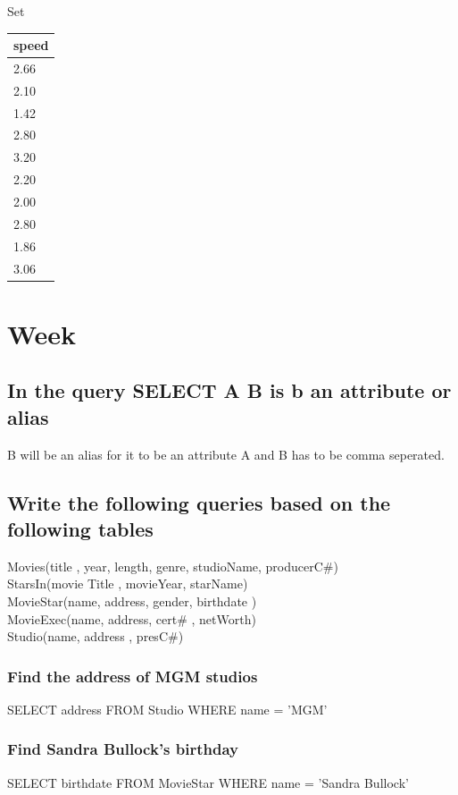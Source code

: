 \documentclass[12pt, a4paper]{article}
\begin{document}
				\begin{minipage}[t]{0.5\textwidth}
				\begin{center}
				Set\\
				\begin{tabular}{|l|}
				\hline
				speed\\\hline
				2.66 \\\hline
				2.10 \\\hline
				1.42 \\\hline
				2.80 \\\hline
				3.20 \\\hline
				2.20 \\\hline
				2.00 \\\hline
				2.80 \\\hline
				1.86 \\\hline
				3.06 \\\hline
				\end{tabular}
				\end{center}
				\end{minipage}
	\section{Week}
		\subsection{In the query SELECT A B is b an attribute or alias}
			B will be an alias for it to be an attribute A and B has to be comma seperated.
		\subsection{Write the following queries based on the following tables}
			Movies(title , year, length, genre, studioName, producerC$\#$)\\
			StarsIn(movie Title , movieYear, starName)\\
			MovieStar(name, address, gender, birthdate )\\
			MovieExec(name, address, cert$\#$ , netWorth)\\
			Studio(name, address , presC$\#$)
			\subsubsection{Find the address of MGM studios}
				SELECT address FROM Studio WHERE name = 'MGM'
			\subsubsection{Find Sandra Bullock's birthday}
				SELECT birthdate FROM MovieStar WHERE name = 'Sandra Bullock'
\end{document}
